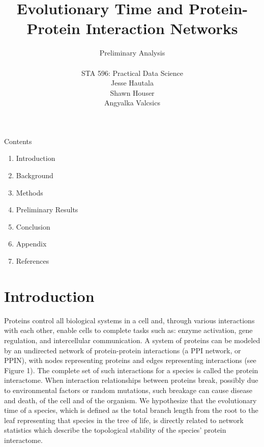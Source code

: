 \documentclass[12pt]{article}
\begin{document}
\title{\textbf{Evolutionary Time and Protein-Protein Interaction Networks}}
\author{Preliminary Analysis \\ \\ STA 596: Practical Data Science \\ Jesse Hautala \\ Shawn Houser \\ Angyalka Valcsics }

	\maketitle
\onehalfspacing

\noindent Contents
\begin{enumerate}[label = \Roman{*}.]
\item Introduction
\item Background
\item Methods
\item Preliminary Results
\item Conclusion
\item Appendix
\item References \newline
\end{enumerate}

\section{Introduction}
Proteins control all biological systems in a cell and, through various interactions with each other, enable cells to complete tasks such as: enzyme activation, gene regulation, and intercellular communication. A system of proteins can be modeled by an undirected network of protein-protein interactions (a PPI network, or PPIN), with nodes representing proteins and edges representing interactions (see Figure 1). The complete set of such interactions for a species is called the protein interactome. When interaction relationships between proteins break, possibly due to environmental factors or random mutations, such breakage can cause disease and death, of the cell and of the organism. We hypothesize that the evolutionary time of a species, which is defined as the total branch length from the root to the leaf representing that species in the tree of life, is directly related to network statistics which describe the topological stability of the species’ protein interactome.
\end{document}

